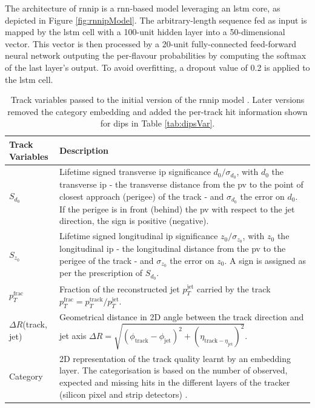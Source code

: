 The architecture of \gls{rnnip} is a \gls{rnn}-based model leveraging an \gls{lstm} core, as depicted in Figure \ref{fig:rnnipModel}. The arbitrary-length sequence fed as input is mapped by the \gls{lstm} cell with a 100-unit hidden layer into a 50-dimensional vector. This vector is then processed by a 20-unit fully-connected feed-forward neural network outputing the per-flavour probabilities by computing the softmax of the last layer's output. To avoid overfitting, a dropout value of 0.2 is applied to the \gls{lstm} cell. 

\begin{table}[h]
  \begin{center}
      \begin{tabular}{C{3cm}|C{13cm}} 
      	 \hline \hline
          Track Variables & Description  \\ \hline \hline
          $S_{d_0}$      & Lifetime signed transverse \gls{ip} significance $d_0 / \sigma_{d_0}$, with $d_0$ the transverse \gls{ip} - the transverse distance from the \gls{pv} to the point of closest approach (perigee) of the track - and $\sigma_{d_0}$ the error on $d_0$. If the perigee is in front (behind) the \gls{pv} with respect to the jet direction, the sign is positive (negative). \\ \hline
          $S_{z_0}$      & Lifetime signed longitudinal \gls{ip} significance $z_0 / \sigma_{z_0}$, with $z_0$ the longitudinal \gls{ip} - the longitudinal distance from the \gls{pv} to the perigee of the track - and $\sigma_{z_0}$ the error on $z_0$. A sign is assigned as per the prescription of $S_{d_0}$. \\ \hline
          $p_T^{\textrm{frac}}$   & Fraction of the reconstructed jet $p_T^{\textrm{jet}}$ carried by the track $p_T^{\textrm{frac}} = p_T^{\textrm{track}} / p_T^{\textrm{jet}}$. \\ \hline
          $\Delta R$(track, jet) & Geometrical distance in 2D angle between the track direction and jet axis $\Delta R = \sqrt{(\phi_{\textrm{track}} - \phi_{\textrm{jet}})^2 + (\eta_{\textrm{track} - \eta_{\textrm{jet}}})^2}$. \\ \hline
          Category       & 2D representation of the track quality learnt by an embedding layer. The categorisation is based on the number of observed, expected and missing hits in the different layers of the tracker (silicon pixel and strip detectors) \cite{ATL-PHYS-PUB-2015-022}.  \\ \hline
      \end{tabular}
    \caption{Track variables passed to the initial version of the \gls{rnnip} model \cite{ATL-PHYS-PUB-2017-003}. Later versions removed the category embedding and added the per-track hit information shown for \gls{dips} in Table \ref{tab:dipsVar}.}
    \label{tab:rnnipVar}
  \end{center}
\end{table}

